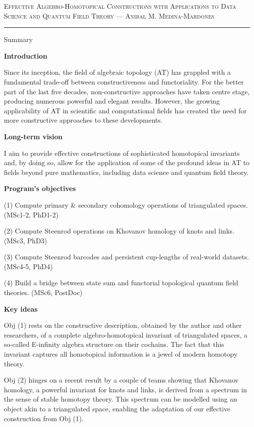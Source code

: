 \documentclass[12pt]{article}
\begin{document}
	\textsc{\large Effective Algebro-Homotopical Constructions with Applications to Data Science and Quantum Field Theory}
	--- \hfill \textsc{\large Anibal M. Medina-Mardones}
	\hrule

	\bigskip
	\begin{center}
		\Large{Summary}
	\end{center}

	\textbf{Introduction}

	\smallskip Since its inception, the field of algebraic topology (AT) has grappled with a fundamental trade-off between constructiveness and functoriality. For the better part of the last five decades, non-constructive approaches have taken centre stage, producing numerous powerful and elegant results. However, the growing applicability of AT in scientific and computational fields has created the need for more constructive approaches to these developments.

	\smallskip\textbf{Long-term vision}

	\smallskip I aim to provide effective constructions of sophisticated homotopical invariants and, by doing so, allow for the application of some of the profound ideas in AT to fields beyond pure mathematics, including data science and quantum field theory.

	\smallskip\textbf{Program's objectives}

	\smallskip
	(1) Compute primary \& secondary cohomology operations of triangulated spaces. \hfill (MSc1-2, PhD1-2)\par
	(2) Compute Steenrod operations on Khovanov homology of knots and links. \hfill (MSc3, PhD3)\par
	(3) Compute Steenrod barcodes and persistent cup-lengths of real-world datasets. \hfill (MSc4-5, PhD4)\par
	(4) Build a bridge between state sum and functorial topological quantum field theories. \hfill (MSc6, PostDoc)\par

	\smallskip\textbf{Key ideas}

	\smallskip Obj (1) rests on the constructive description, obtained by the author and other researchers, of a complete algebro-homotopical invariant of triangulated spaces, a so-called E-infinity algebra structure on their cochains. The fact that this invariant captures all homotopical information is a jewel of modern homotopy theory.

	\smallskip Obj (2) hinges on a recent result by a couple of teams showing that Khovanov homology, a powerful invariant for knots and links, is derived from a spectrum in the sense of stable homotopy theory. This spectrum can be modelled using an object akin to a triangulated space, enabling the adaptation of our effective construction from Obj (1).
\end{document}
